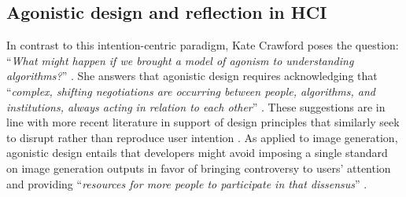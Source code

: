 


\subsection{Agonistic design and reflection in HCI}
\label{hai-reflection}


In contrast to this intention-centric paradigm, Kate Crawford poses the question: ``\textit{What might happen if we brought a model of agonism to understanding algorithms?}'' \cite{crawford2014agonistic}. 
She answers that agonistic design requires acknowledging that ``\textit{complex, shifting negotiations are occurring between people, algorithms, and institutions, always acting in relation to each other}'' \cite{crawford2014agonistic}.
These suggestions are in line with more recent literature in support of design principles that similarly seek to disrupt rather than reproduce user intention \cite{cai2024antagonisticai, sarkar2024intention, herrieetal2024democratization}. 
As applied to image generation, agonistic design entails that developers might avoid imposing a single standard on image generation outputs in favor of bringing controversy to users' attention and providing ``\textit{resources for more people to participate in that dissensus}'' \cite{crawford2014agonistic}.

